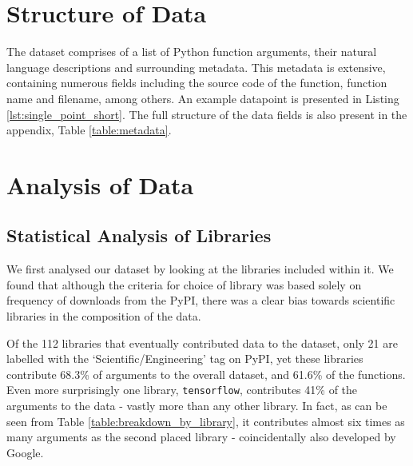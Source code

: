 \section{Structure of Data}

The dataset comprises of a list of Python function arguments, their natural language descriptions and surrounding metadata. 
This metadata is extensive, containing numerous fields including the source code of the function, function name and filename, among others. 
An example datapoint is presented in Listing \ref{lst:single_point_short}. The full structure of the data fields is also present in the appendix, Table \ref{table:metadata}. 


\section{Analysis of Data} %
\label{sec:analysis_of_data}

\subsection{Statistical Analysis of Libraries}

We first analysed our dataset by looking at the libraries included within it.
We found that although the criteria for choice of library was based solely on frequency of downloads from the PyPI, there was a clear bias towards scientific libraries in the composition of the data.

Of the 112 libraries that eventually contributed data to the dataset, only 21 are labelled with the `Scientific/Engineering' tag on PyPI, yet these libraries contribute 68.3\% of arguments to the overall dataset, and 61.6\% of the functions. 
Even more surprisingly one library, \texttt{tensorflow}, contributes 41\% of the arguments to the data - vastly more than any other library.
In fact, as can be seen from Table \ref{table:breakdown_by_library}, it contributes almost six times as many arguments as the second placed library - coincidentally also developed by Google. 

